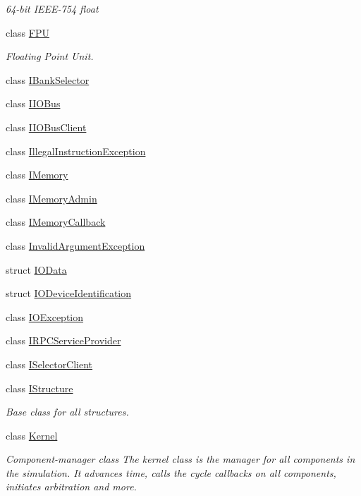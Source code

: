 \begin{DoxyCompactItemize}
\begin{DoxyCompactList}\small\item\em 64-\/bit I\+E\+E\+E-\/754 float \end{DoxyCompactList}\item 
class \hyperlink{class_simulator_1_1_f_p_u}{F\+P\+U}
\begin{DoxyCompactList}\small\item\em Floating Point Unit. \end{DoxyCompactList}\item 
class \hyperlink{class_simulator_1_1_i_bank_selector}{I\+Bank\+Selector}
\item 
class \hyperlink{class_simulator_1_1_i_i_o_bus}{I\+I\+O\+Bus}
\item 
class \hyperlink{class_simulator_1_1_i_i_o_bus_client}{I\+I\+O\+Bus\+Client}
\item 
class \hyperlink{class_simulator_1_1_illegal_instruction_exception}{Illegal\+Instruction\+Exception}
\item 
class \hyperlink{class_simulator_1_1_i_memory}{I\+Memory}
\item 
class \hyperlink{class_simulator_1_1_i_memory_admin}{I\+Memory\+Admin}
\item 
class \hyperlink{class_simulator_1_1_i_memory_callback}{I\+Memory\+Callback}
\item 
class \hyperlink{class_simulator_1_1_invalid_argument_exception}{Invalid\+Argument\+Exception}
\item 
struct \hyperlink{struct_simulator_1_1_i_o_data}{I\+O\+Data}
\item 
struct \hyperlink{struct_simulator_1_1_i_o_device_identification}{I\+O\+Device\+Identification}
\item 
class \hyperlink{class_simulator_1_1_i_o_exception}{I\+O\+Exception}
\item 
class \hyperlink{class_simulator_1_1_i_r_p_c_service_provider}{I\+R\+P\+C\+Service\+Provider}
\item 
class \hyperlink{class_simulator_1_1_i_selector_client}{I\+Selector\+Client}
\item 
class \hyperlink{class_simulator_1_1_i_structure}{I\+Structure}
\begin{DoxyCompactList}\small\item\em Base class for all structures. \end{DoxyCompactList}\item 
class \hyperlink{class_simulator_1_1_kernel}{Kernel}
\begin{DoxyCompactList}\small\item\em Component-\/manager class The kernel class is the manager for all components in the simulation. It advances time, calls the cycle callbacks on all components, initiates arbitration and more. \end{DoxyCompactList}\item 

\end{DoxyCompactItemize}
